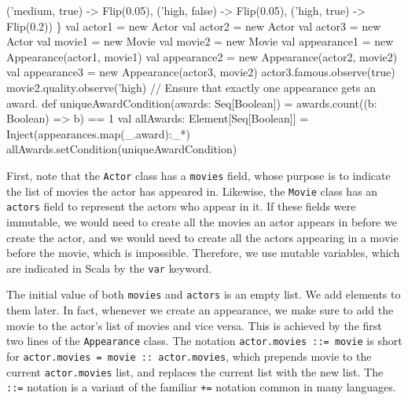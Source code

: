 \begin{flushleft}
{\newline \tab \tab ('medium, true) -> Flip(0.05), 
\newline \tab \tab ('high, false) -> Flip(0.05), 
\newline \tab \tab ('high, true) -> Flip(0.2))
\newline \}
\newline 
\newline val actor1 = new Actor 
\newline val actor2 = new Actor 
\newline val actor3 = new Actor 
\newline val movie1 = new Movie 
\newline val movie2 = new Movie
\newline val appearance1 = new Appearance(actor1, movie1)
\newline val appearance2 = new Appearance(actor2, movie2) 
\newline val appearance3 = new Appearance(actor3, movie2) 
\newline actor3.famous.observe(true) 
\newline movie2.quality.observe('high)
\newline 
\newline // Ensure that exactly one appearance gets an award. 
\newline def uniqueAwardCondition(awards: Seq[Boolean]) =
\newline \tab awards.count((b: Boolean) => b) == 1 
\newline val allAwards: Element[Seq[Boolean]] =
\newline \tab Inject(appearances.map(\_.award):\_*)
\newline allAwards.setCondition(uniqueAwardCondition)
}
\end{flushleft}

First, note that the \texttt{Actor} class has a \texttt{movies} field, whose purpose is to indicate the list of movies the actor has appeared in. Likewise, the \texttt{Movie} class has an \texttt{actors} field to represent the actors who appear in it. If these fields were immutable, we would need to create all the movies an actor appears in before we create the actor, and we would need to create all the actors appearing in a movie before the movie, which is impossible. Therefore, we use mutable variables, which are indicated in Scala by the \texttt{var} keyword.

The initial value of both \texttt{movies} and \texttt{actors} is an empty list. We add elements to them later. In fact, whenever we create an appearance, we make sure to add the movie to the actor's list of movies and vice versa. This is achieved by the first two lines of the \texttt{Appearance} class. The notation \texttt{actor.movies ::= movie} is short for \texttt{actor.movies = movie :: actor.movies}, which prepends movie to the current \texttt{actor.movies} list, and replaces the current list with the new list. The \texttt{::=} notation is a variant of the familiar \texttt{+=} notation common in many languages.

